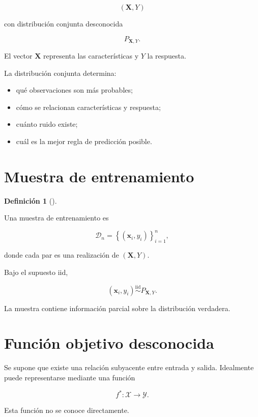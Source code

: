 \documentclass[
  spanish,
  11pt,
  letterpaper,
  DIV=11,
  numbers=noendperiod]{scrreprt}
\providecommand{\tightlist}{%
  \setlength{\itemsep}{0pt}\setlength{\parskip}{0pt}}
\theoremstyle{definition}
\newtheorem{definition}{Definición}[chapter]
\theoremstyle{plain}
\theoremstyle{definition}
\theoremstyle{remark}
\begin{document}
\[
(\mathbf{X},Y)
\]

con distribución conjunta desconocida

\[
P_{\mathbf{X},Y}.
\]

El vector \(\mathbf{X}\) representa las características y \(Y\) la
respuesta.

La distribución conjunta determina:

\begin{itemize}
\tightlist
\item
  qué observaciones son más probables;
\item
  cómo se relacionan características y respuesta;
\item
  cuánto ruido existe;
\item
  cuál es la mejor regla de predicción posible.
\end{itemize}

\section{Muestra de entrenamiento}\label{muestra-de-entrenamiento}

\begin{definition}[]\protect\hypertarget{def-muestra-entrenamiento}{}\label{def-muestra-entrenamiento}

Una muestra de entrenamiento es

\[
\mathcal{D}_n
=
\left\{
(\mathbf{x}_i,y_i)
\right\}_{i=1}^{n},
\]

donde cada par es una realización de \((\mathbf{X},Y)\).

\end{definition}

Bajo el supuesto iid,

\[
(\mathbf{x}_i,y_i)
\overset{\text{iid}}{\sim}
P_{\mathbf{X},Y}.
\]

La muestra contiene información parcial sobre la distribución verdadera.

\section{Función objetivo
desconocida}\label{funciuxf3n-objetivo-desconocida-1}

Se supone que existe una relación subyacente entre entrada y salida.
Idealmente puede representarse mediante una función

\[
f^{*}:\mathcal{X}\to\mathcal{Y}.
\]

Esta función no se conoce directamente.
\end{document}
